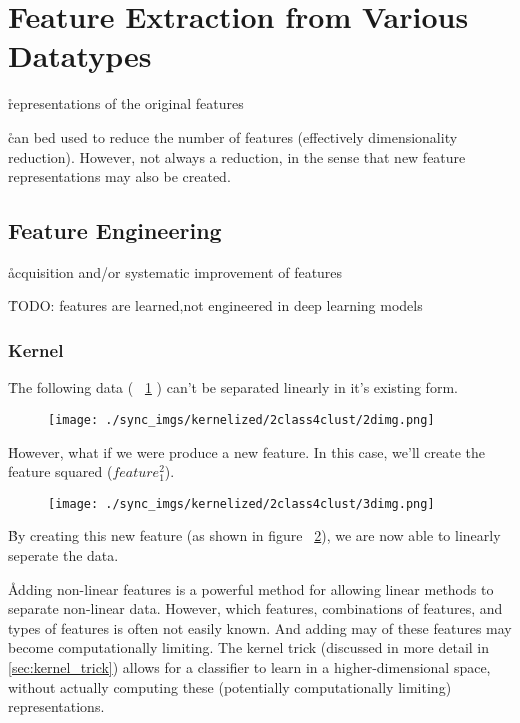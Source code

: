 \section{Feature Extraction from Various Datatypes}


\r{representations of the original features}

\r{can bed used to reduce the number of features (effectively dimensionality reduction). However, not always a reduction, in the sense that new feature representations may also be created.}

\subsection{Feature Engineering}

\r{acquisition and/or systematic improvement of features}

\r{TODO: features are learned,not engineered in deep learning models}

\subsubsection{Kernel}

\r{The following data ( ~\ref{fig:kernelized_2class4clust_2dimg} ) can't be separated linearly in it's existing form.}

\begin{figure}
\centering
\texttt{[image: ./sync\_imgs/kernelized/2class4clust/2dimg.png]}
\label{fig:kernelized_2class4clust_2dimg}
\end{figure}

\r{However, what if we were produce a new feature. In this case, we'll create the feature squared ($feature_1^2$)}.

\begin{figure}
\centering
\texttt{[image: ./sync\_imgs/kernelized/2class4clust/3dimg.png]}
\label{fig:kernelized_2class4clust_3dimg}
\end{figure}

\r{By creating this new feature (as shown in figure ~\ref{fig:kernelized_2class4clust_3dimg}), we are now able to linearly seperate the data.}

 \r{Adding non-linear features is a powerful method for allowing linear methods to separate non-linear data. However, which features, combinations of features, and types of features is often not easily known. And adding may of these features may become computationally limiting. The {kernel trick} (discussed in more detail in \ref{sec:kernel_trick}) allows for a classifier to learn in a higher-dimensional space, without actually computing these (potentially computationally limiting) representations.}


